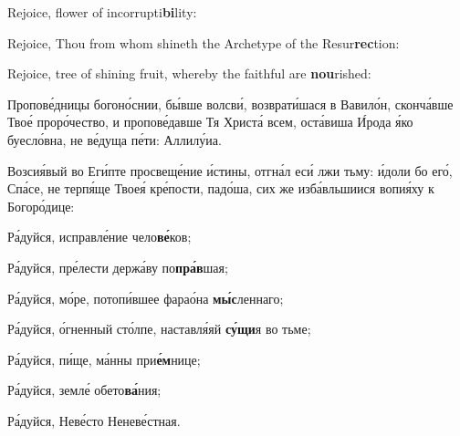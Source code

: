 \PeopleRejoice Rejoice, flower of incorrupti\textbf{bi}lity:


Rejoice, Thou from whom shineth the Archetype of the Resur\textbf{rec}tion:


Rejoice, tree of shining fruit, whereby the faithful are \textbf{nou}rished:


\pagebreak

\begin{russian}



  \Ierei Пропове́дницы богоно́снии, бы́вше волсви́, возврати́шася в Вавило́н, сконча́вше Твое́ проро́чество, и пропове́давше Тя Христа́ всем, оста́виша И́рода я́ко буесло́вна, не ве́дуща пе́ти: Аллилу́иа.


  \Ierei Возсия́вый во Еги́пте просвеще́ние и́стины, отгна́л еси́ лжи тьму: и́доли бо его́, Спа́се, не терпя́ще Твоея́ кре́пости, падо́ша, сих же изба́вльшиися вопия́ху к Богоро́дице:

  Ра́дуйся, исправле́ние чело\textbf{ве́}ков;


  Ра́дуйся, пре́лести держа́ву по\textbf{пра́в}шая;


  Ра́дуйся, мо́ре, потопи́вшее фарао́на \textbf{мы́с}леннаго;


  Ра́дуйся, о́гненный сто́лпе, наставля́яй \textbf{су́щи}я во тьме;


  Ра́дуйся, пи́ще, ма́нны при\textbf{е́м}нице;


  Ра́дуйся, земле́ обето\textbf{ва́}ния;


  Ра́дуйся, Неве́сто Неневе́стная.


\end{russian}

